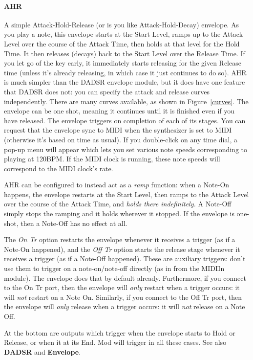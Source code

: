 \documentclass{article}
\begin{document}
\paragraph{AHR}  A simple Attack-Hold-Release (or is you like Attack-Hold-Decay) envelope.  As you play a note, this envelope starts at the Start Level, ramps up to the Attack Level over the course of the Attack Time, then holds at that level for the Hold Time.  It then releases (decays) back to the Start Level over the Release Time.  If you let go of the key early, it immediately starts releasing for the given Release time (unless it's already releasing, in which case it just continues to do so).  AHR is much simpler than the DADSR envelope module, but it does have one feature that DADSR does not: you can specify the attack and release curves independently.  There are many curves available, as shown in Figure~\ref{curves}.  The envelope can be one shot, meaning it continues until it is finished even if you have released.   The envelope triggers on completion of each of its stages.  You can request that the envelope sync to MIDI when the synthesizer is set to MIDI (otherwise it's based on time as usual).  If you double-click on any time dial, a pop-up menu will appear which lets you set various note speeds corresponding to playing at 120BPM.  If the MIDI clock is running, these note speeds will correspond to the MIDI clock's rate.

AHR can be configured to instead act as a {\it ramp} function: when a Note-On happens, the envelope restarts at the Start Level, then ramps to the Attack Level over the course of the Attack Time, and  {\it holds there indefinitely.}  A Note-Off simply stops the ramping and it holds wherever it stopped.  If the envelope is one-shot, then a Note-Off has no effect at all. 

The {\it On Tr} option restarts the envelope whenever it receives a trigger (as if a Note-On happened), and the {\it Off Tr} option starts the release stage whenever it receives a trigger (as if a Note-Off happened).  These are auxiliary triggers: don't use them to trigger on a note-on/note-off directly (as in from the MIDIIn module).  The envelope does that by default already.  Furthermore, if you connect to the On Tr port, then the envelope will {\it only} restart when a trigger occurs: it will {\it not} restart on a Note On.  Similarly, if you connect to the Off Tr port, then the envelope will {\it only} release when a trigger occurs: it will {\it not} release on a Note Off.  


At the bottom are outputs which trigger when the envelope starts to Hold or Release, or when it at its End.  Mod will trigger in all these cases.  See also {\bf DADSR} and {\bf Envelope}.
\end{document}
